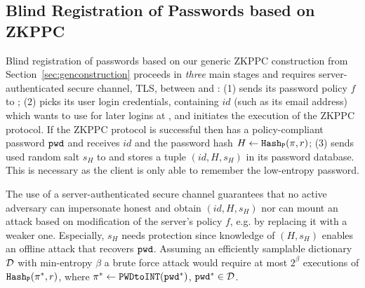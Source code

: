 %


\subsection{Blind Registration of Passwords based on ZKPPC}\label{sec:pwreg}
Blind registration of passwords based on our generic \ac{ZKPPC} construction from Section~\ref{sec:genconstruction} proceeds in \emph{three} main stages and requires server-authenticated secure channel, \eg \ac{TLS}, between \Client and \Server: 
(1) \Server sends its password policy $f$ to \Client; 
(2) \Client picks its user login credentials, containing $id$ (such as its email address) which \Client wants to use for later logins at \Server, and initiates the execution of the \ac{ZKPPC} protocol. 
If the \ac{ZKPPC} protocol is successful then \Client has a policy-compliant password $\mathtt{pwd}$ and \Server receives $id$ and the password hash $H\gets\mathtt{Hash_P}(\pi,r)$; 
(3) \Client sends used random salt $s_H$ to \Server and \Server stores a tuple $(id, H, s_H)$ in its password database.
This is necessary as the client is only able to remember the low-entropy password.

The use of a server-authenticated secure channel guarantees that no active adversary \cA can impersonate honest \Server and obtain $(id, H, s_H)$ nor can \cA mount an attack based on modification of the server's policy $f$, e.g. by replacing it with a weaker one.
Especially, $s_H$ needs protection since knowledge of $(H, s_H)$ enables an offline attack that recovers $\mathtt{pwd}$. 
Assuming an efficiently samplable dictionary $\mathcal{D}$ with min-entropy $\beta$ a brute force attack would require at most $2^\beta$ executions of $\mathtt{Hash_P}(\pi^\ast,r)$, where $\pi^\ast \gets \texttt{PWDtoINT}(\mathtt{pwd}^\ast)$, $\mathtt{pwd}^\ast\in\mathcal{D}$.

